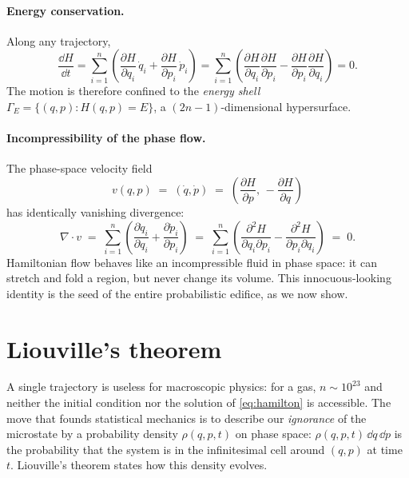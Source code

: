 \paragraph{Energy conservation.} Along any trajectory,
\begin{equation}
  \frac{\dd H}{\dd t}
  = \sum_{i=1}^n \left(
      \frac{\partial H}{\partial q_i}\,\dot q_i
      + \frac{\partial H}{\partial p_i}\,\dot p_i
    \right)
  = \sum_{i=1}^n \left(
      \frac{\partial H}{\partial q_i}\frac{\partial H}{\partial p_i}
      - \frac{\partial H}{\partial p_i}\frac{\partial H}{\partial q_i}
    \right)
  = 0 .
  \label{eq:energy-conservation}
\end{equation}
The motion is therefore confined to the \emph{energy shell}
$\Gamma_E = \{(q,p) : H(q,p) = E\}$, a $(2n-1)$-dimensional hypersurface.

\paragraph{Incompressibility of the phase flow.} The phase-space velocity
field
\begin{equation}
  v(q, p) \;=\; (\dot q, \dot p)
  \;=\; \left( \frac{\partial H}{\partial p},\, -\frac{\partial H}{\partial q} \right)
  \label{eq:phase-velocity}
\end{equation}
has identically vanishing divergence:
\begin{equation}
  \nabla \cdot v
  \;=\; \sum_{i=1}^n \left(
      \frac{\partial \dot q_i}{\partial q_i}
      + \frac{\partial \dot p_i}{\partial p_i}
    \right)
  \;=\; \sum_{i=1}^n \left(
      \frac{\partial^2 H}{\partial q_i \partial p_i}
      - \frac{\partial^2 H}{\partial p_i \partial q_i}
    \right)
  \;=\; 0 .
  \label{eq:incompressible}
\end{equation}
Hamiltonian flow behaves like an incompressible fluid in phase space: it can
stretch and fold a region, but never change its volume. This innocuous-looking
identity is the seed of the entire probabilistic edifice, as we now show.

\section{Liouville's theorem}\label{sec:liouville}

A single trajectory is useless for macroscopic physics: for a gas,
$n \sim 10^{23}$ and neither the initial condition nor the solution of
\eqref{eq:hamilton} is accessible. The move that founds statistical mechanics
is to describe our \emph{ignorance} of the microstate by a probability
density $\rho(q, p, t)$ on phase space: $\rho(q,p,t)\,\dd q\,\dd p$ is the
probability that the system is in the infinitesimal cell around $(q,p)$ at
time $t$. Liouville's theorem states how this density evolves.

